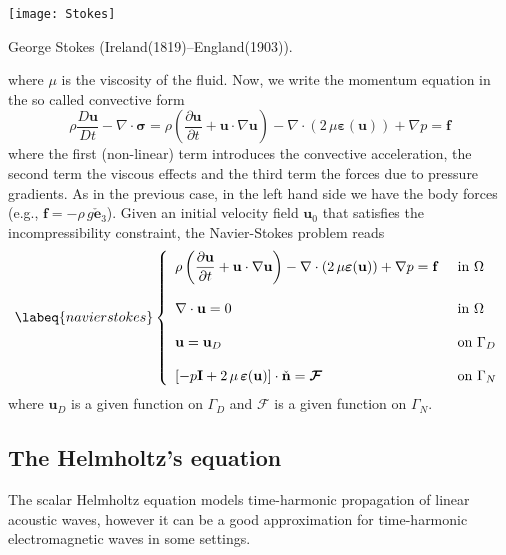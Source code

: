 \begin{marginfigure}[3.0cm]
	\texttt{[image: Stokes]}
	\caption[]{George Stokes (Ireland(1819)--England(1903)).} 
\end{marginfigure}
where $\mu$ is the viscosity of the fluid. Now, we write the momentum equation in the so called convective form
\begin{equation}
\rho\dfrac{D{\mathbf{u}}}{Dt} - \nabla \cdot\boldsymbol{\sigma} =  
\rho\left (\dfrac{\partial{\mathbf{u}}}{\partial{t}} +  \mathbf{u} \cdot \nabla \mathbf{u}\right ) 
- \nabla \cdot ( 2 \, \mu \boldsymbol{\varepsilon}(\mathbf{u})) + \nabla{p} = \mathbf{f}
\end{equation}
where the first (non-linear) term introduces the convective acceleration, the second term
the viscous effects and the third term the forces due to pressure gradients. As in the previous
case, in the left hand side we have the body forces (e.g., $\mathbf{f} = -\rho \, g  \check{\mathbf{e}}_3$).
Given an initial velocity field $\mathbf{u}_0$ that satisfies the incompressibility constraint,
the Navier-Stokes problem reads
\begin{equation}
\labeq{navierstokes}
\left\{
\begin{array}{ll}
\rho\left (\dfrac{\partial{\mathbf{u}}}{\partial{t}} +  \mathbf{u} \cdot \nabla \mathbf{u}\right )
- \nabla \cdot ( 2 \, \mu \boldsymbol{\varepsilon}(\mathbf{u})) + \nabla{p} = \mathbf{f} & \mbox{ in } \Omega \\
& \\
\nabla \cdot \mathbf{u} = 0  & \mbox{ in } \Omega \\
& \\
\mathbf{u} = \mathbf{u}_D & \mbox{ on } \Gamma_D \\
& \\
\left [-p\mathbf{I} + 2\,\mu\, \boldsymbol{\varepsilon}(\mathbf{u}) \right ] \cdot \check{\mathbf{n}} = \boldsymbol{\mathcal{F}} & \mbox{ on } \Gamma_N
\end{array}
\right.
\end{equation}
where $\mathbf{u}_D$ is a given function on $\Gamma_D$ and $\boldsymbol{\mathcal{F}}$ is
a given function on $\Gamma_N$.


\subsection{The Helmholtz's equation}
The scalar Helmholtz equation models time-harmonic propagation of linear acoustic waves, 
however it can be a good approximation for time-harmonic electromagnetic waves in some settings. 

